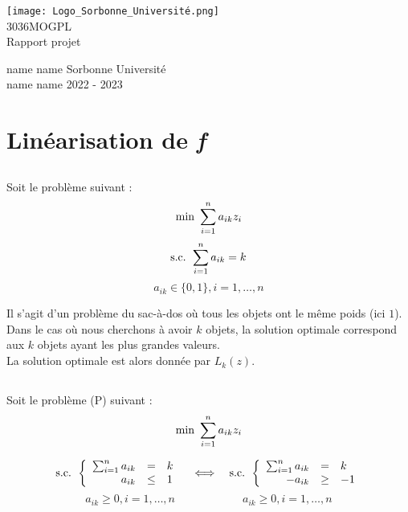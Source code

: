 \documentclass{article}
\makeatletter
\newcommand\HUGE{\@setfontsize\Huge{30}{36}}
\makeatother
\begin{document}
\thispagestyle{empty}
\begin{center}
\texttt{[image: Logo\_Sorbonne\_Université.png]} \\
\vspace{3cm}
\HUGE MOGPL \\ Rapport projet \\
\vfill
\end{center}
\large name name \hfill Sorbonne Université \\
name name \hfill 2022 - 2023
\pagebreak
\tableofcontents
\pagebreak





\section{Linéarisation de \textit{f}}
\subsection{} Soit le problème suivant :
$$\textmd{min } \sum_{i=1}^{n} a_{ik} z_{i}$$
$$\textmd{s.c. } \sum_{i=1}^{n} a_{ik} = k$$
$$a_{ik} \in \{ 0, 1\}, i=1,\ldots,n $$

Il s'agit d'un problème du sac-à-dos où tous les objets ont le même poids (ici $1$). Dans le cas où nous cherchons à avoir $k$ objets, la solution optimale correspond aux $k$ objets ayant les plus grandes valeurs. \\
La solution optimale est alors donnée par $L_k(z)$.


\subsection{}
Soit le problème (P) suivant :
$$\textmd{min } \sum_{i=1}^{n} a_{ik} z_{i}$$

$$ \textmd{s.c. }
\left \{
\begin{array}{r c l}
  \sum_{i=1}^{n} a_{ik}  & = & k \\
  a_{ik} & \leq & 1
\end{array}
\right .
\quad \Longleftrightarrow \quad \textmd{s.c. }
\left \{
\begin{array}{r c l}
  \sum_{i=1}^{n} a_{ik}  & = & k \\
  -a_{ik} & \geq & -1
\end{array}
\right .
$$
$$a_{ik} \geq 0, i=1,\ldots,n \qquad\qquad\qquad a_{ik} \geq 0, i=1,\ldots,n$$
\end{document}
